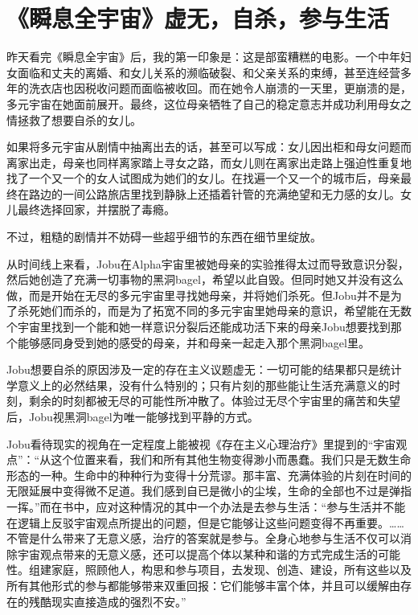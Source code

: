 \chapter{《瞬息全宇宙》\pozhehao{}虚无，自杀，参与生活}





昨天看完《瞬息全宇宙》后，我的第一印象是：这是部蛮糟糕的电影。一个中年妇女面临和丈夫的离婚、和女儿关系的濒临破裂、和父亲关系的束缚，甚至连经营多年的洗衣店也因税收问题而面临被收回。而在她令人崩溃的一天里，更崩溃的是，多元宇宙在她面前展开。最终，这位母亲牺牲了自己的稳定意志并成功利用母女之情拯救了想要自杀的女儿。

如果将多元宇宙从剧情中抽离出去的话，甚至可以写成：女儿因出柜和母女问题而离家出走，母亲也同样离家踏上寻女之路，而女儿则在离家出走路上强迫性重复地找了一个又一个的女人试图成为她们的女儿。在找遍一个又一个的城市后，母亲最终在路边的一间公路旅店里找到静脉上还插着针管的充满绝望和无力感的女儿。女儿最终选择回家，并摆脱了毒瘾。

不过，粗糙的剧情并不妨碍一些超乎细节的东西在细节里绽放。

从时间线上来看，Jobu在Alpha宇宙里被她母亲的实验推得太过而导致意识分裂，然后她创造了充满一切事物的黑洞bagel，希望以此自毁。但同时她又并没有这么做，而是开始在无尽的多元宇宙里寻找她母亲，并将她们杀死。但Jobu并不是为了杀死她们而杀的，而是为了拓宽不同的多元宇宙里她母亲的意识，希望能在无数个宇宙里找到一个能和她一样意识分裂后还能成功活下来的母亲\pozhehao{}Jobu想要找到那个能够感同身受到她的感受的母亲，并和母亲一起走入那个黑洞bagel里。

Jobu想要自杀的原因涉及一定的存在主义议题\pozhehao{}虚无：一切可能的结果都只是统计学意义上的必然结果，没有什么特别的；只有片刻的那些能让生活充满意义的时刻，剩余的时刻都被无尽的可能性所冲散了。体验过无尽个宇宙里的痛苦和失望后，Jobu视黑洞bagel为唯一能够找到平静的方式。

Jobu看待现实的视角在一定程度上能被视《存在主义心理治疗》里提到的“宇宙观点”：“从这个位置来看，我们和所有其他生物变得渺小而愚蠢。我们只是无数生命形态的一种。生命中的种种行为变得十分荒谬。那丰富、充满体验的片刻在时间的无限延展中变得微不足道。我们感到自已是微小的尘埃，生命的全部也不过是弹指一挥。”而在书中，应对这种情况的其中一个办法是去参与生活：“参与生活并不能在逻辑上反驳宇宙观点所提出的问题，但是它能够让这些问题变得不再重要。……不管是什么带来了无意义感，治疗的答案就是参与。全身心地参与生活不仅可以消除宇宙观点带来的无意义感，还可以提高个体以某种和谐的方式完成生活的可能性。组建家庭，照顾他人，构思和参与项目，去发现、创造、建设，所有这些以及所有其他形式的参与都能够带来双重回报：它们能够丰富个体，并且可以缓解由存在的残酷现实直接造成的强烈不安。”

